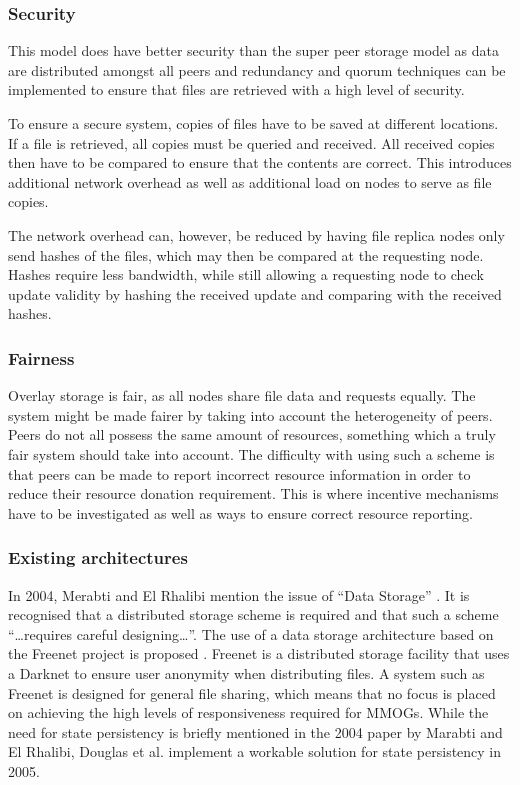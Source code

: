 \documentclass[10pt,a4paper,journal,cspaper,compsoc]{IEEEtran}
\begin{document}

\subsubsection{Security}
This model does have better security than the super peer storage model as data are distributed amongst all peers and redundancy and quorum techniques
can be implemented to ensure that files are retrieved with a high level of security.

To ensure a secure system, copies of files have to be saved at different locations. If a file is retrieved, all copies must be queried and received.
All received copies then have to be compared to ensure that the contents are correct. This introduces additional network overhead as well as
additional load on nodes to serve as file copies.

The network overhead can, however, be reduced by having file replica nodes only send hashes of the files, which may then be compared at the
requesting node. Hashes require less bandwidth, while still allowing a requesting node to check update validity by hashing the received update and
comparing with the received hashes.

\subsubsection{Fairness}

Overlay storage is fair, as all nodes share file data and requests equally. The system might be made fairer by taking into account the heterogeneity
of peers. Peers do not all possess the same amount of resources, something which a truly fair system should take into account. The difficulty with
using such a scheme is that peers can be made to report incorrect resource information in order to reduce their resource donation requirement. This
is where incentive mechanisms have to be investigated as well as ways to ensure correct resource reporting.

\subsubsection{Existing architectures}

In 2004, Merabti and El Rhalibi mention the issue of ``Data Storage'' \cite{using_freenet_storage}. It is recognised that a distributed storage
scheme is required and that such a scheme ``\ldots requires careful designing\ldots''. The use of a data storage architecture based on the Freenet
project is proposed \cite{clarke_freenet}. Freenet is a distributed storage facility that uses a Darknet to ensure user anonymity when distributing
files. A system such as Freenet is designed for general file sharing, which means that no focus is placed on achieving the high levels of
responsiveness required for MMOGs. While the need for state persistency is briefly mentioned in the 2004 paper by Marabti and El Rhalibi, Douglas et
al. implement a workable solution for state persistency in 2005.
\end{document}
